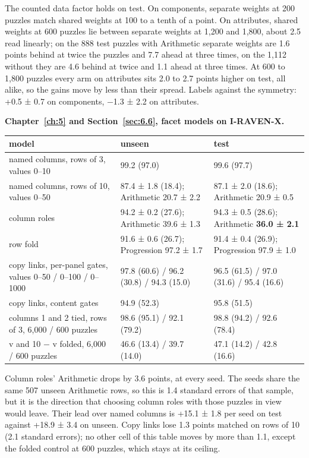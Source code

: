 The counted data factor holds on test. On components, separate weights at 200 puzzles match shared weights at 100 to a tenth of a point. On attributes, shared weights at 600 puzzles lie between separate weights at 1,200 and 1,800, about 2.5 read linearly; on the 888 test puzzles with Arithmetic separate weights are 1.6 points behind at twice the puzzles and 7.7 ahead at three times, on the 1,112 without they are 4.6 behind at twice and 1.1 ahead at three times. At 600 to 1,800 puzzles every arm on attributes sits 2.0 to 2.7 points higher on test, all alike, so the gains move by less than their spread. Labels against the symmetry: +0.5 ± 0.7 on components, −1.3 ± 2.2 on attributes.

\textbf{Chapter~\ref{ch:5} and Section~\ref{sec:6.6}, facet models on I-RAVEN-X.}

\begin{center}\small
\begin{tabularx}{\linewidth}{@{}YYY@{}}
\toprule
model & unseen & test \\
\midrule
named columns, rows of 3, values 0–10 & 99.2 (97.0) & 99.6 (97.7) \\
named columns, rows of 10, values 0–50 & 87.4 ± 1.8 (18.4); Arithmetic 20.7 ± 2.2 & 87.1 ± 2.0 (18.6); Arithmetic 20.9 ± 0.5 \\
column roles & 94.2 ± 0.2 (27.6); Arithmetic 39.6 ± 1.3 & 94.3 ± 0.5 (28.6); Arithmetic \textbf{36.0 ± 2.1} \\
row fold & 91.6 ± 0.6 (26.7); Progression 97.2 ± 1.7 & 91.4 ± 0.4 (26.9); Progression 97.9 ± 1.0 \\
copy links, per-panel gates, values 0–50 / 0–100 / 0–1000 & 97.8 (60.6) / 96.2 (30.8) / 94.3 (15.0) & 96.5 (61.5) / 97.0 (31.6) / 95.4 (16.6) \\
copy links, content gates & 94.9 (52.3) & 95.8 (51.5) \\
columns 1 and 2 tied, rows of 3, 6,000 / 600 puzzles & 98.6 (95.1) / 92.1 (79.2) & 98.8 (94.2) / 92.6 (78.4) \\
v and 10 − v folded, 6,000 / 600 puzzles & 46.6 (13.4) / 39.7 (14.0) & 47.1 (14.2) / 42.8 (16.6) \\
\bottomrule
\end{tabularx}
\end{center}

Column roles' Arithmetic drops by 3.6 points, at every seed. The seeds share the same 507 unseen Arithmetic rows, so this is 1.4 standard errors of that sample, but it is the direction that choosing column roles with those puzzles in view would leave. Their lead over named columns is +15.1 ± 1.8 per seed on test against +18.9 ± 3.4 on unseen. Copy links lose 1.3 points matched on rows of 10 (2.1 standard errors); no other cell of this table moves by more than 1.1, except the folded control at 600 puzzles, which stays at its ceiling.

